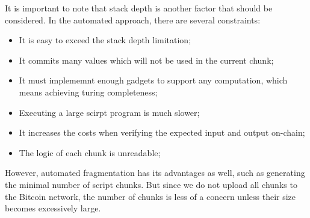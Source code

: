 It is important to note that stack depth is another factor that should be considered. In the automated approach, there are several constraints:
\begin{itemize}
    \item It is easy to exceed the stack depth limitation;
    \item It commits many values which will not be used in the current chunk;
    \item It must implememnt enough gadgets to support any computation, which means achieving turing completeness;
    \item Executing a large scirpt program is much slower;
    \item It increases the costs when verifying the expected input and output on-chain;
    \item The logic of each chunk is unreadable;
\end{itemize}

However, automated fragmentation has its advantages as well, such as generating the minimal number of script chunks. 
But since we do not upload all chunks to the Bitcoin network, the number of chunks is less of a concern unless their size becomes excessively large.
